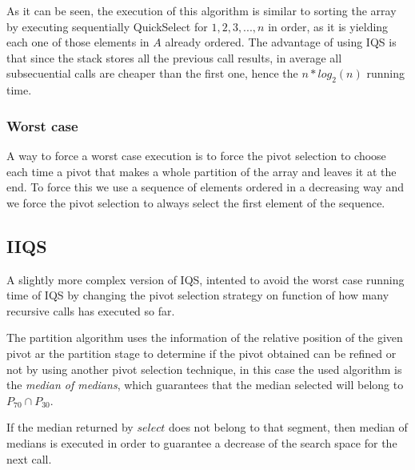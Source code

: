 \documentclass{iccmemoria}
\begin{document}
As it can be seen, the execution of this algorithm is similar to sorting the array by executing sequentially QuickSelect for $1,2,3,...,n$ in order, as it is yielding each one of those elements in $A$ already ordered. The advantage of using IQS is that since the stack stores all the previous call results, in average all subsecuential calls are cheaper than the first one, hence the $n*log_2(n)$ running time.

\subsubsection{Worst case}
A way to force a worst case execution is to force the pivot selection to choose each time a pivot that makes a whole partition of the array and leaves it at the end. To force this we use a sequence of elements ordered in a decreasing way and we force the pivot selection to always select the first element of the sequence.

\subsection{IIQS}

A slightly more complex version of IQS, intented to avoid the worst case running time of IQS by changing the pivot selection strategy on function of how many recursive calls has executed so far\cite{7416566}.

The partition algorithm uses the information of the relative position of the given pivot ar the partition stage to determine if the pivot obtained can be refined or not by using another pivot selection technique, in this case the used algorithm is the \textit{median of medians}\cite{Blum_Floyd_Pratt_Rivest_Tarjan_1973}, which guarantees that the median selected will belong to $P_{70} \cap P_{30}$.

If the median returned by $select$ does not belong to that segment, then median of medians is executed in order to guarantee a decrease of the search space for the next call.
\end{document}

